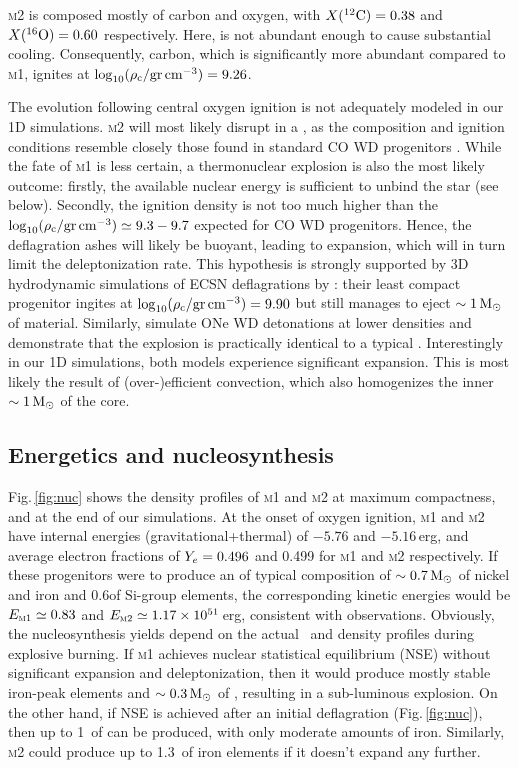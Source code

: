 \documentclass[../../main/thesis_msc.tex]{subfiles}
\begin{document}
\textsc{m2} is composed mostly of carbon and oxygen, with $\abun{C}{12}=0.38$ and $\abun{O}{16}=0.60$ respectively. 
 Here,  is not abundant enough to cause  substantial cooling. Consequently, carbon, which is significantly more abundant compared to \textsc{m1}, ignites at $\logrhoc=9.26$. 
 
The evolution following central oxygen ignition is not adequately modeled in our 1D simulations. 
 \textsc{m2} will most likely disrupt in a \ia, as the composition and
 ignition conditions resemble closely those found in standard CO WD 
 progenitors \citep{Nomoto:1982zz}. While the fate of \textsc{m1} is less 
 certain, a thermonuclear explosion is also the most likely outcome: 
 firstly, the available nuclear energy is sufficient to unbind the star (see 
 below). Secondly, the ignition density is not too much higher than the $\logrhoc\simeq9.3-9.7$ expected for CO WD progenitors. Hence, the 
 deflagration ashes will likely be buoyant, leading to expansion, which will 
 in turn limit the deleptonization rate. This hypothesis is strongly supported
 by 3D hydrodynamic  simulations of ECSN deflagrations by \cite{Jones:2018ule}: their least compact progenitor ingites at $\logrhoc=9.90$ but still manages to eject  $\sim 1\msun$ of material. 
 Similarly,  \cite{marquardt2015} simulate ONe WD detonations at lower 
 densities and demonstrate that the explosion is practically identical to a 
 typical \ia. 
 Interestingly in our 1D simulations, both models experience significant expansion. This is most likely the result of (over-)efficient convection, which also homogenizes the inner $\sim 1\msun$ of the core. 
 
 
 
 

\subsection{Energetics and nucleosynthesis}\label{sec:3}
Fig.\,\ref{fig:nuc} shows the density profiles of \textsc{m1} and \textsc{m2} at maximum compactness, and at the end of our simulations. At the onset of oxygen ignition, \textsc{m1} and \textsc{m2} have internal energies (gravitational+thermal) of $-5.76$ and $-5.16$\,erg, and average electron fractions of $\ye= 0.496$ and  0.499 for \textsc{m1} and \textsc{m2} respectively. If these progenitors were to produce an \ia of  typical composition of $\sim 0.7\msun$ of nickel and iron and 0.6\msun of Si-group elements, the corresponding kinetic energies would be $E_{\rm \textsc{m1}}\simeq 0.83$ and $E_{\rm \textsc{m2}}\simeq 1.17\times10^{51}$\,erg, consistent with observations. 
Obviously, the nucleosynthesis yields depend on the actual
\ye\ and density profiles during explosive burning. If 
\textsc{m1} achieves nuclear statistical equilibrium (NSE)
without significant expansion and deleptonization, then it
would produce mostly stable iron-peak elements and $\sim 0.3\msun$ of , resulting in a sub-luminous 
explosion. On the other hand, if NSE is achieved after an 
initial deflagration (Fig.\,\ref{fig:nuc}), then up to 
1\msun\ of  can be produced, with only moderate
amounts of iron. Similarly, \textsc{m2} could produce up 
to 1.3\msun\ of iron elements if it doesn't expand any 
further. 
\end{document}
